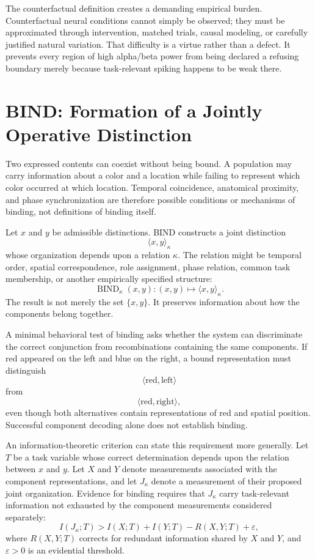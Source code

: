 \documentclass[11pt]{book}
\begin{document}
The counterfactual definition creates a demanding empirical burden. Counterfactual neural conditions cannot simply be observed; they must be approximated through intervention, matched trials, causal modeling, or carefully justified natural variation. That difficulty is a virtue rather than a defect. It prevents every region of high alpha/beta power from being declared a refusing boundary merely because task-relevant spiking happens to be weak there.

\section*{BIND: Formation of a Jointly Operative Distinction}

Two expressed contents can coexist without being bound. A population may carry information about a color and a location while failing to represent which color occurred at which location. Temporal coincidence, anatomical proximity, and phase synchronization are therefore possible conditions or mechanisms of binding, not definitions of binding itself.

Let $x$ and $y$ be admissible distinctions. BIND constructs a joint distinction
\[
\langle x,y\rangle_{\kappa}
\]
whose organization depends upon a relation $\kappa$. The relation might be temporal order, spatial correspondence, role assignment, phase relation, common task membership, or another empirically specified structure:
\[
\operatorname{BIND}_{\kappa}(x,y):
(x,y)\longmapsto\langle x,y\rangle_{\kappa}.
\]
The result is not merely the set $\{x,y\}$. It preserves information about how the components belong together.

A minimal behavioral test of binding asks whether the system can discriminate the correct conjunction from recombinations containing the same components. If red appeared on the left and blue on the right, a bound representation must distinguish
\[
\langle \mathrm{red},\mathrm{left}\rangle
\]
from
\[
\langle \mathrm{red},\mathrm{right}\rangle,
\]
even though both alternatives contain representations of red and spatial position. Successful component decoding alone does not establish binding.

An information-theoretic criterion can state this requirement more generally. Let $T$ be a task variable whose correct determination depends upon the relation between $x$ and $y$. Let $X$ and $Y$ denote measurements associated with the component representations, and let $J_{\kappa}$ denote a measurement of their proposed joint organization. Evidence for binding requires that $J_{\kappa}$ carry task-relevant information not exhausted by the component measurements considered separately:
\[
I(J_{\kappa};T)
>
I(X;T)+I(Y;T)-R(X,Y;T)+\varepsilon,
\]
where $R(X,Y;T)$ corrects for redundant information shared by $X$ and $Y$, and $\varepsilon>0$ is an evidential threshold.
\end{document}
